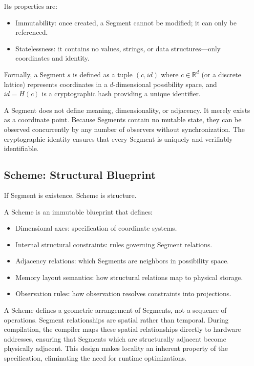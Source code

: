 \documentclass[
  a4paper,
  DIV=11,
  numbers=noendperiod]{scrartcl}
\providecommand{\tightlist}{%
  \setlength{\itemsep}{0pt}\setlength{\parskip}{0pt}}
\begin{document}
Its properties are:

\begin{itemize}
\tightlist
\item
  Immutability: once created, a Segment cannot be modified; it can only
  be referenced.
\item
  Statelessness: it contains no values, strings, or data
  structures---only coordinates and identity.
\end{itemize}

Formally, a Segment \(s\) is defined as a tuple \((c, id)\) where
\(c \in \mathbb{R}^d\) (or a discrete lattice) represents coordinates in
a \(d\)-dimensional possibility space, and \(id = H(c)\) is a
cryptographic hash providing a unique identifier.

A Segment does not define meaning, dimensionality, or adjacency. It
merely exists as a coordinate point. Because Segments contain no mutable
state, they can be observed concurrently by any number of observers
without synchronization. The cryptographic identity ensures that every
Segment is uniquely and verifiably identifiable.

\subsection{Scheme: Structural
Blueprint}\label{scheme-structural-blueprint}

If Segment is existence, Scheme is structure.

A Scheme is an immutable blueprint that defines:

\begin{itemize}
\tightlist
\item
  Dimensional axes: specification of coordinate systems.
\item
  Internal structural constraints: rules governing Segment relations.
\item
  Adjacency relations: which Segments are neighbors in possibility
  space.
\item
  Memory layout semantics: how structural relations map to physical
  storage.
\item
  Observation rules: how observation resolves constraints into
  projections.
\end{itemize}

A Scheme defines a geometric arrangement of Segments, not a sequence of
operations. Segment relationships are spatial rather than temporal.
During compilation, the compiler maps these spatial relationships
directly to hardware addresses, ensuring that Segments which are
structurally adjacent become physically adjacent. This design makes
locality an inherent property of the specification, eliminating the need
for runtime optimizations.
\end{document}
